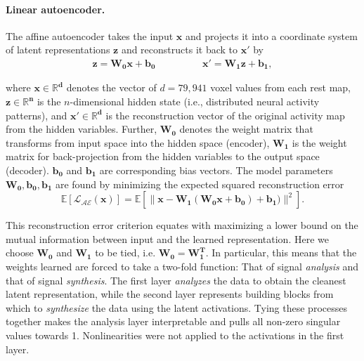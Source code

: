 \documentclass{article} %
\begin{document}
\paragraph{Linear autoencoder.}
The affine autoencoder takes the input 
$\mathbf{x}$ and projects it into a coordinate system of
latent representations $\mathbf{z}$
and reconstructs it back to $\mathbf{x'}$ by
\begin{eqnarray}
    \mathbf{z} = \mathbf{W_0} \mathbf{x} + \mathbf{b_0} \hspace{2cm}
    \mathbf{x'} = \mathbf{W_1} \mathbf{z} + \mathbf{b_1},
  \label{eq:autoenc}
\end{eqnarray}

where $\mathbf{x \in \mathbb{R}^{d}}$ denotes the vector of $d=79{,}941$
voxel values from each
rest map,
$\mathbf{z \in \mathbb{R}^{n}}$ is the $n$-dimensional hidden state
(i.e., distributed neural activity patterns), and 
$\mathbf{x' \in \mathbb{R}^{d}}$
is the reconstruction vector of the original activity map
from the hidden variables. 
Further, $\mathbf{W_0}$ denotes the weight matrix that
transforms
from input space into the hidden space (encoder),
$\mathbf{W_1}$ is the weight matrix for back-projection
from the hidden variables to the
output space (decoder).
$\mathbf{b_0}$ and $\mathbf{b_1}$ are corresponding bias vectors.
The model parameters $\mathbf{W_0, b_0, b_1}$ are found by
minimizing the expected squared reconstruction error
\begin{equation}
  \mathbb E\left[{\mathcal{L_{AE}}}(\mathbf{x})\right] = %
  \mathbb E\left[\| \mathbf{x} - \mathbf{W_1}(\mathbf{W_0}\mathbf{x} + \mathbf{b_0}) + \mathbf{b_1}) \|^2\right].
\end{equation}

This reconstruction error criterion equates with
maximizing a lower bound on the mutual information between
input and the learned representation.
Here we choose $\mathbf{W_0}$ and $\mathbf{W_1}$ to be tied, i.e.
$\mathbf{W_0} = \mathbf{W_1^T}$. In particular, this means that the weights
learned are forced to take a two-fold function: That of signal 
\textit{analysis} and that of signal \textit{synthesis}.
The first layer \textit{analyzes}
the data to obtain the cleanest latent representation,
while the second
layer represents building blocks from which to \textit{synthesize} the data
using the latent activations.
Tying these processes together makes the analysis
layer interpretable and pulls all non-zero singular values towards 1. 
Nonlinearities were not applied to the
activations in the first layer.
\end{document}
